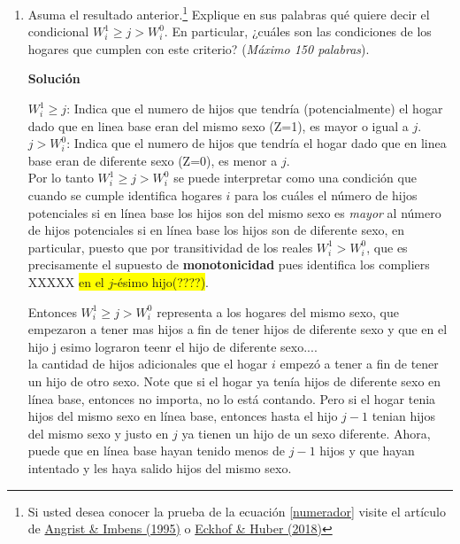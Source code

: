 \documentclass[a4paper, answers, addpoints, 11pt]{exam}
\newenvironment{solucion}{%
  \begin{mdframed}[
    backgroundcolor=blue!5,    %
    linecolor=blue!50,          %
    linewidth=2pt,              %
    leftmargin=10pt,            %
    rightmargin=8pt,           %
    topline=true,              %
    bottomline=true,            %
    roundcorner=10pt,           %
    innerleftmargin=10pt,       %
    innerrightmargin=10pt,      %
    innerbottommargin=10pt,     %
    innertopmargin=10pt         %
  ]%
  \begin{tcolorbox}[colframe=blue!50!black, colback=blue!50, coltitle=white, sharp corners=all, boxrule=1mm, width=\textwidth, halign=left, valign=center, top=0mm, bottom=0mm, left=0mm, right=0mm] \textbf{Solución} \end{tcolorbox} }{\end{mdframed}}
\begin{document}
\begin{enumerate}
\begin{enumerate}
            \item Asuma el resultado anterior.\footnote{\footnotesize{Si usted desea conocer la prueba de la ecuación \ref{numerador} visite el artículo de \href{https://www.jstor.org/stable/2291054}{Angrist \& Imbens (1995)}} o \href{https://ideas.repec.org/p/fri/fribow/fribow00492.html}{Eckhof \& Huber (2018)}} Explique en sus palabras qué quiere decir el condicional $W_i^1 \geq j > W_i^0$. En particular, ¿cuáles son las condiciones de los hogares que cumplen con este criterio? (\textit{Máximo 150 palabras}).

            
            \begin{solucion}
            $W_i^1 \geq j $: Indica que el numero de hijos que tendría (potencialmente) el hogar dado que en linea base eran del mismo sexo (Z=1), es mayor o igual a $j$.\\
            $j > W_i^0 $: Indica que el numero de hijos que tendría el hogar dado que en linea base eran de diferente sexo (Z=0), es menor a $j$.\\

            Por lo tanto $W_i^1\geq j > W_i^0$ se puede interpretar como una condición que cuando se cumple identifica hogares $i$ para los cuáles el número de hijos potenciales si en línea base los hijos son del mismo sexo es \textit{mayor} al número de hijos potenciales si en línea base los hijos son de diferente sexo, en particular, puesto que por transitividad de los reales $W_i^1> W_i^0$, que es precisamente el supuesto de \textbf{monotonicidad} pues identifica los compliers XXXXX \colorbox{yellow}{en el $j$-ésimo hijo(????)}.
            
            Entonces $W_i^1 \geq j > W_i^0$ representa a los hogares del mismo sexo, que empezaron a tener mas hijos a fin de tener hijos de diferente sexo y que en el hijo j esimo lograron teenr el hijo de diferente sexo....\\
            
            la cantidad de hijos adicionales que el hogar $i$ empezó a tener a fin de tener un hijo de otro sexo. Note que si el hogar ya tenía hijos de diferente sexo en línea base, entonces no importa, no lo está contando. Pero si el hogar tenia hijos del mismo sexo en línea base, entonces hasta el hijo $j-1$ tenian hijos del mismo sexo y justo en $j$ ya tienen un hijo de un sexo diferente. Ahora, puede que en línea base hayan tenido menos de $j-1$ hijos y que hayan intentado y les haya salido hijos del mismo sexo.\\


\end{solucion}
\end{enumerate}
\end{enumerate}
\end{document}
